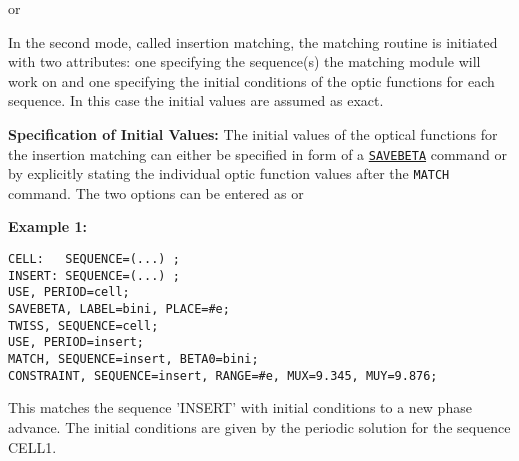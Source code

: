 
or


In the second mode, called insertion matching, the matching routine is
initiated with two attributes: one specifying the sequence(s) the
matching module will work on and one specifying the initial conditions
of the optic functions for each sequence. In this case the initial
values are assumed as exact. 
    
\textbf{Specification of Initial Values:}
The initial values of the optical
functions  for the insertion matching can either be specified in form of
a \hyperref[sec:savebeta]{\texttt{SAVEBETA}} command or by
explicitly stating the individual optic function values after the
\texttt{MATCH} command. The two options can be entered as         
or

\textbf{Example 1:}   
\begin{verbatim}
CELL:   SEQUENCE=(...) ;
INSERT: SEQUENCE=(...) ;
USE, PERIOD=cell;
SAVEBETA, LABEL=bini, PLACE=#e;
TWISS, SEQUENCE=cell;
USE, PERIOD=insert;
MATCH, SEQUENCE=insert, BETA0=bini;
CONSTRAINT, SEQUENCE=insert, RANGE=#e, MUX=9.345, MUY=9.876;
\end{verbatim}

This matches the sequence 'INSERT' with initial conditions to a new
phase advance. The initial conditions are given by the periodic solution
for the sequence CELL1. 
    
